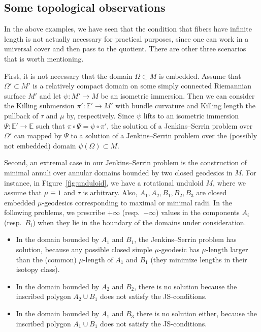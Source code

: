 \documentclass[a4paper,10pt,reqno]{amsart}
\newcommand{\E}{\mathbb{E}}
\theoremstyle{definition}
\theoremstyle{remark}
\numberwithin{equation}{section}
\begin{document}
\subsection{Some topological observations}

In the above examples, we have seen that the condition that fibers have infinite length is not actually necessary for practical purposes, since one can work in a universal cover and then pass to the quotient. There are other three scenarios that is worth mentioning.

First, it is not necessary that the domain $\Omega\subset M$ is embedded. Assume that $\Omega'\subset M'$ is a relatively compact domain on some simply connected Riemannian surface $M'$ and let $\psi:M'\to M$ be an isometric immersion. Then we can consider the Killing submersion $\pi':\E'\to M'$ with bundle curvature and Killing length the pullback of $\tau$ and $\mu$ by, respectively. Since $\psi$ lifts to an isometric immersion $\Psi:\E'\to\E$ such that $\pi\circ\Psi=\psi\circ\pi'$, the solution of a Jenkins--Serrin problem over $\Omega'$ can mapped by $\Psi$ to a solution of a Jenkins--Serrin problem over the (possibly not embedded) domain $\psi(\Omega)\subset M$.

Second, an extremal case in our Jenkins--Serrin problem is the construction of minimal annuli over annular domains bounded by two closed geodesics in $M$. For instance, in Figure~\ref{fig:unduloid}, we have a rotational unduloid $M$, where we assume that $\mu\equiv 1$ and $\tau$ is arbitrary. Also, $A_1,A_2,B_1,B_2,B_3$ are closed embedded $\mu$-geodesics corresponding to maximal or minimal radii. In the following problems, we prescribe $+\infty$ (resp.\ $-\infty$) values in the components $A_i$ (resp.\ $B_i$) when they lie in the boundary of the domains under consideration.
\begin{itemize}
	\item In the domain bounded by $A_1$ and $B_1$, the Jenkins--Serrin problem has solution, because any possible closed simple $\mu$-geodesic has $\mu$-length larger than the (common) $\mu$-length of $A_1$ and $B_1$ (they minimize lengths in their isotopy class).
	\item In the domain bounded by $A_2$ and $B_2$, there is no solution because the inscribed polygon $A_2\cup B_1$ does not satisfy the JS-conditions.
	\item In the domain bounded by $A_1$ and $B_3$ there is no solution either, because the inscribed polygon $A_1\cup B_1$ does not satisfy the JS-conditions. 
\end{itemize}
\end{document}

